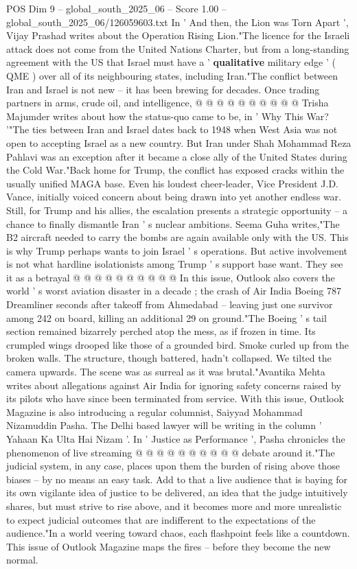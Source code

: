 \begin{textsample}{POS Dim 9 – global\_south\_2025\_06 – Score 1.00 – global\_south\_2025\_06/126059603.txt}
In ' And then, the Lion was Torn Apart ', Vijay Prashad writes about the Operation Rising Lion."The licence for the Israeli attack does not come from the United Nations Charter, but from a long-standing agreement with the US that Israel must have a ' \textbf{qualitative} military edge ' ( QME ) over all of its neighbouring states, including Iran."The conflict between Iran and Israel is not new -- it has been brewing for decades.
Once trading partners in arms, crude oil, and intelligence, @ @ @ @ @ @ @ @ @ @ Trisha Majumder writes about how the status-quo came to be, in ' Why This War? '"The ties between Iran and Israel dates back to 1948 when West Asia was not open to accepting Israel as a new country.
But Iran under Shah Mohammad Reza Pahlavi was an exception after it became a close ally of the United States during the Cold War."Back home for Trump, the conflict has exposed cracks within the usually unified MAGA base.
Even his loudest cheer-leader, Vice President J.D.
Vance, initially voiced concern about being drawn into yet another endless war.
Still, for Trump and his allies, the escalation presents a strategic opportunity -- a chance to finally dismantle Iran ' s nuclear ambitions.
Seema Guha writes,"The B2 aircraft needed to carry the bombs are again available only with the US.
This is why Trump perhaps wants to join Israel ' s operations.
But active involvement is not what hardline isolationists among Trump ' s support base want.
They see it as a betrayal @ @ @ @ @ @ @ @ @ @ In this issue, Outlook also covers the world ' s worst aviation disaster in a decade ; the crash of Air India Boeing 787 Dreamliner seconds after takeoff from Ahmedabad -- leaving just one survivor among 242 on board, killing an additional 29 on ground."The Boeing ' s tail section remained bizarrely perched atop the mess, as if frozen in time.
Its crumpled wings drooped like those of a grounded bird.
Smoke curled up from the broken walls.
The structure, though battered, hadn't collapsed.
We tilted the camera upwards.
The scene was as surreal as it was brutal."Avantika Mehta writes about allegations against Air India for ignoring safety concerns raised by its pilots who have since been terminated from service.
With this issue, Outlook Magazine is also introducing a regular columnist, Saiyyad Mohammad Nizamuddin Pasha.
The Delhi based lawyer will be writing in the column ' Yahaan Ka Ulta Hai Nizam '.
In ' Justice as Performance ', Pasha chronicles the phenomenon of live streaming @ @ @ @ @ @ @ @ @ @ debate around it."The judicial system, in any case, places upon them the burden of rising above those biases -- by no means an easy task.
Add to that a live audience that is baying for its own vigilante idea of justice to be delivered, an idea that the judge intuitively shares, but must strive to rise above, and it becomes more and more unrealistic to expect judicial outcomes that are indifferent to the expectations of the audience."In a world veering toward chaos, each flashpoint feels like a countdown.
This issue of Outlook Magazine maps the fires -- before they become the new normal.

\end{textsample}
